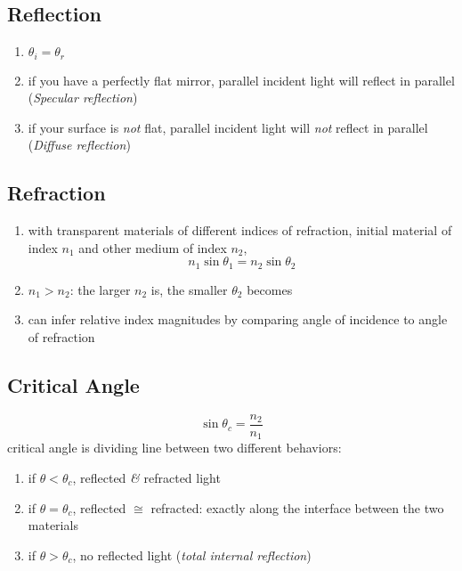 \documentclass[twocolumn,draft]{article}
\begin{document}
\subsection*{Reflection}
\begin{enumerate}
	\item $\theta_{i} = \theta_{r}$
	\item if you have a perfectly flat mirror, parallel incident light will reflect in parallel
		  (\emph{Specular reflection})
	\item if your surface is \emph{not} flat, parallel incident light will \emph{not} reflect in
		  parallel (\emph{Diffuse reflection})
\end{enumerate}

\subsection*{Refraction}
\begin{enumerate}
	\item with transparent materials of different indices of refraction, initial material of
	index $n_{1}$ and other medium of index $n_{2}$, 
		\[
			n_{1}\sin{\theta_{1}} = n_{2}\sin{\theta_{2}}
		\]
	\item $n_{1}>n_{2}$: the larger $n_{2}$ is, the smaller $\theta_{2}$ becomes
	\item can infer relative index magnitudes by comparing angle of incidence to angle of
	refraction
\end{enumerate}

\subsection*{Critical Angle}
	\begin{equation*}
		\boxed{\sin{\theta_{c}} = \frac{n_{2}}{n_{1}}}
	\end{equation*}
\noindent critical angle is dividing line between two different behaviors:
	\begin{enumerate}
		\item if $\theta < \theta_{c}$, reflected \emph{\&} refracted light
		\item if $\theta = \theta_{c}$, reflected $\cong$ refracted: exactly along the interface
			  between the two materials
		\item if $\theta > \theta_{c}$, no reflected light (\emph{total internal reflection})
	\end{enumerate}

\end{document}

